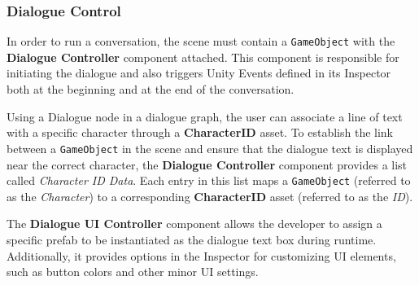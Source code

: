 \subsubsection{Dialogue Control}
In order to run a conversation, the scene must contain a \verb|GameObject| with the \textbf{Dialogue Controller} component attached. This component is responsible for initiating the dialogue and also triggers Unity Events defined in its Inspector both at the beginning and at the end of the conversation. 

Using a Dialogue node in a dialogue graph, the user can associate a line of text with a specific character through a \textbf{CharacterID} asset. To establish the link between a \verb|GameObject| in the scene and ensure that the dialogue text is displayed near the correct character, the \textbf{Dialogue Controller} component provides a list called \textit{Character ID Data}. Each entry in this list maps a \verb|GameObject| (referred to as the \textit{Character}) to a corresponding \textbf{CharacterID} asset (referred to as the \textit{ID}).

The \textbf{Dialogue UI Controller} component allows the developer to assign a specific prefab to be instantiated as the dialogue text box during runtime. Additionally, it provides options in the Inspector for customizing UI elements, such as button colors and other minor UI settings.
